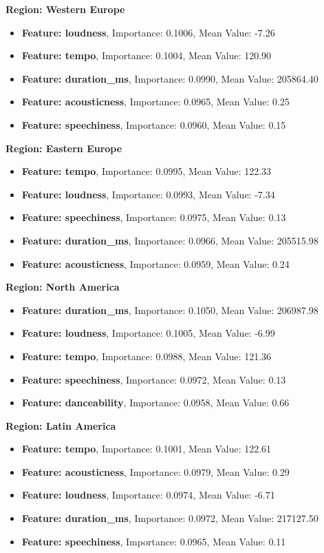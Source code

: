 \textbf{Region: Western Europe }
\begin{itemize}
    \item \textbf{Feature: loudness}, Importance: 0.1006, Mean Value: -7.26
    \item \textbf{Feature: tempo}, Importance: 0.1004, Mean Value: 120.90
    \item \textbf{Feature: duration\_ms}, Importance: 0.0990, Mean Value: 205864.40
    \item \textbf{Feature: acousticness}, Importance: 0.0965, Mean Value: 0.25
    \item \textbf{Feature: speechiness}, Importance: 0.0960, Mean Value: 0.15
\end{itemize}

\textbf{Region: Eastern Europe }
\begin{itemize}
    \item \textbf{Feature: tempo}, Importance: 0.0995, Mean Value: 122.33
    \item \textbf{Feature: loudness}, Importance: 0.0993, Mean Value: -7.34
    \item \textbf{Feature: speechiness}, Importance: 0.0975, Mean Value: 0.13
    \item \textbf{Feature: duration\_ms}, Importance: 0.0966, Mean Value: 205515.98
    \item \textbf{Feature: acousticness}, Importance: 0.0959, Mean Value: 0.24
\end{itemize}

\textbf{Region: North America }
\begin{itemize}
    \item \textbf{Feature: duration\_ms}, Importance: 0.1050, Mean Value: 206987.98
    \item \textbf{Feature: loudness}, Importance: 0.1005, Mean Value: -6.99
    \item \textbf{Feature: tempo}, Importance: 0.0988, Mean Value: 121.36
    \item \textbf{Feature: speechiness}, Importance: 0.0972, Mean Value: 0.13
    \item \textbf{Feature: danceability}, Importance: 0.0958, Mean Value: 0.66
\end{itemize}


\textbf{Region: Latin America }
\begin{itemize}
    \item \textbf{Feature: tempo}, Importance: 0.1001, Mean Value: 122.61
    \item \textbf{Feature: acousticness}, Importance: 0.0979, Mean Value: 0.29
    \item \textbf{Feature: loudness}, Importance: 0.0974, Mean Value: -6.71
    \item \textbf{Feature: duration\_ms}, Importance: 0.0972, Mean Value: 217127.50
    \item \textbf{Feature: speechiness}, Importance: 0.0965, Mean Value: 0.11
\end{itemize}

